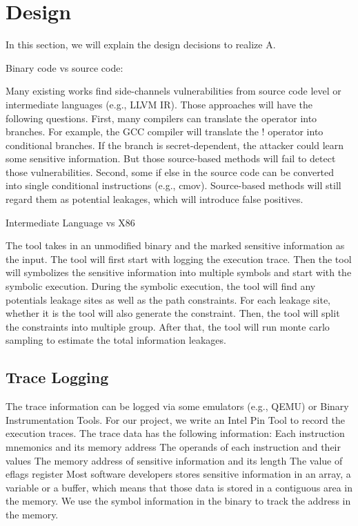 \section{Design}
In this section, we will explain the design decisions to realize A. 

Binary code vs source code:

Many existing works find side-channels vulnerabilities from source code level or intermediate languages (e.g., LLVM IR). Those approaches will have the following questions. First, many compilers can translate the operator into branches. For example, the GCC compiler will translate the ! operator into conditional branches. If the branch is secret-dependent, the attacker could learn some sensitive information. But those source-based methods will fail to detect those vulnerabilities. Second, some if else in the source code can be converted into single conditional instructions (e.g., cmov). Source-based methods will still regard them as potential leakages, which will introduce false positives.

Intermediate Language vs X86 


The tool takes in an unmodified binary and the marked sensitive information as the input. The tool will first start with logging the execution trace. Then the tool will symbolizes the sensitive information into multiple symbols and start with the symbolic execution. During the symbolic execution, the tool will find any potentials leakage sites as well as the path constraints. For each leakage site, whether it is  the tool will also generate the constraint. Then, the tool will split the constraints into multiple group. After that, the tool will run monte carlo sampling to estimate the total information leakages.

\subsection{Trace Logging}
The trace information can be logged via some emulators (e.g., QEMU) or Binary Instrumentation Tools. For our project, we write an Intel Pin Tool to record the execution traces. The trace data has the following information:
Each instruction mnemonics and its memory address
The operands of each instruction and their values
The memory address of sensitive information and its length
The value of eflags register
Most software developers stores sensitive information in an array, a variable or a buffer, which means that those data is stored in a contiguous area in the memory. We use the symbol information in the binary to track the address in the memory.


